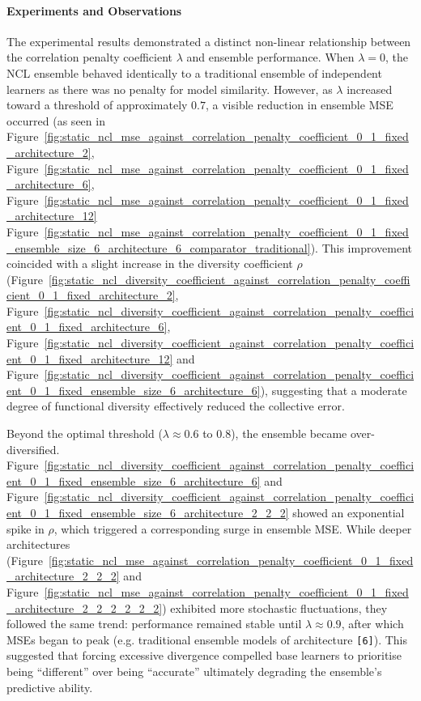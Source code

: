 \documentclass{article}
\begin{document}
\paragraph{Experiments and Observations}
The experimental results demonstrated a distinct non-linear relationship between the correlation penalty coefficient $\lambda$ and ensemble performance. When $\lambda = 0$, the NCL ensemble behaved identically to a traditional ensemble of independent learners as there was no penalty for model similarity. However, as $\lambda$ increased toward a threshold of approximately $0.7$, a visible reduction in ensemble MSE occurred (as seen in Figure~\ref{fig:static_ncl_mse_against_correlation_penalty_coefficient_0_1_fixed_architecture_2}, Figure~\ref{fig:static_ncl_mse_against_correlation_penalty_coefficient_0_1_fixed_architecture_6}, Figure~\ref{fig:static_ncl_mse_against_correlation_penalty_coefficient_0_1_fixed_architecture_12} Figure~\ref{fig:static_ncl_mse_against_correlation_penalty_coefficient_0_1_fixed_ensemble_size_6_architecture_6_comparator_traditional}). This improvement coincided with a slight increase in the diversity coefficient $\rho$ (Figure~\ref{fig:static_ncl_diversity_coefficient_against_correlation_penalty_coefficient_0_1_fixed_architecture_2}, Figure~\ref{fig:static_ncl_diversity_coefficient_against_correlation_penalty_coefficient_0_1_fixed_architecture_6}, Figure~\ref{fig:static_ncl_diversity_coefficient_against_correlation_penalty_coefficient_0_1_fixed_architecture_12} and Figure~\ref{fig:static_ncl_diversity_coefficient_against_correlation_penalty_coefficient_0_1_fixed_ensemble_size_6_architecture_6}), suggesting that a moderate degree of functional diversity effectively reduced the collective error. 

Beyond the optimal threshold ($\lambda \approx 0.6$ to $0.8$), the ensemble became over-diversified. Figure~\ref{fig:static_ncl_diversity_coefficient_against_correlation_penalty_coefficient_0_1_fixed_ensemble_size_6_architecture_6} and Figure~\ref{fig:static_ncl_diversity_coefficient_against_correlation_penalty_coefficient_0_1_fixed_ensemble_size_6_architecture_2_2_2} showed an exponential spike in $\rho$, which triggered a corresponding surge in ensemble MSE. While deeper architectures (Figure~\ref{fig:static_ncl_mse_against_correlation_penalty_coefficient_0_1_fixed_architecture_2_2_2} and Figure~\ref{fig:static_ncl_mse_against_correlation_penalty_coefficient_0_1_fixed_architecture_2_2_2_2_2_2}) exhibited more stochastic fluctuations, they followed the same trend: performance remained stable until $\lambda \approx 0.9$, after which MSEs began to peak (e.g. traditional ensemble models of architecture \texttt{[6]}). This suggested that forcing excessive divergence compelled base learners to prioritise being ``different'' over being ``accurate'' ultimately degrading the ensemble's predictive ability. 
\end{document}
